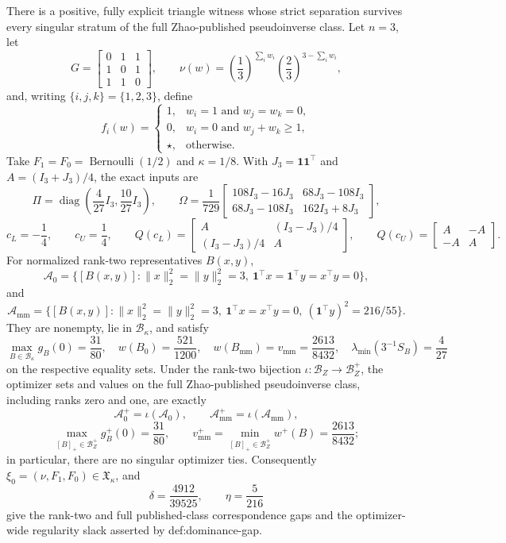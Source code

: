 There is a positive, fully explicit triangle witness whose strict separation survives every singular stratum of the full Zhao-published pseudoinverse class.  Let \(n=3\), let
\[
G=\begin{bmatrix}0&1&1\\1&0&1\\1&1&0\end{bmatrix},
\qquad
\nu(w)=\left(\frac13\right)^{\sum_iw_i}
       \left(\frac23\right)^{3-\sum_iw_i},
\]
and, writing \(\{i,j,k\}=\{1,2,3\}\), define
\[
f_i(w)=
\begin{cases}
1,&w_i=1\text{ and }w_j=w_k=0,\\
0,&w_i=0\text{ and }w_j+w_k\ge1,\\
\star,&\text{otherwise}.
\end{cases}
\]
Take \(F_1=F_0=\operatorname{Bernoulli}(1/2)\) and \(\kappa=1/8\).  With \(J_3=\mathbf1\mathbf1^{\top}\) and \(A=(I_3+J_3)/4\), the exact inputs are
\[
\Pi=\operatorname{diag}\!\left(\frac4{27}I_3,\frac{10}{27}I_3\right),
\qquad
\Omega=\frac1{729}
\begin{bmatrix}
108I_3-16J_3&68J_3-108I_3\\
68J_3-108I_3&162I_3+8J_3
\end{bmatrix},
\]
\[
c_L=-\frac14,
\qquad c_U=\frac14,
\qquad
Q(c_L)=\begin{bmatrix}A&(I_3-J_3)/4\\(I_3-J_3)/4&A\end{bmatrix},
\qquad
Q(c_U)=\begin{bmatrix}A&-A\\-A&A\end{bmatrix}.
\]
For normalized rank-two representatives \(B(x,y)\),
\[
\mathcal A_0=\{[B(x,y)]:\lVert x\rVert_2^2=\lVert y\rVert_2^2=3,
\ \mathbf1^{\top}x=\mathbf1^{\top}y=x^{\top}y=0\},
\]
and
\[
\mathcal A_{\mathrm{mm}}=\{[B(x,y)]:\lVert x\rVert_2^2=\lVert y\rVert_2^2=3,
\ \mathbf1^{\top}x=x^{\top}y=0,
\ (\mathbf1^{\top}y)^2=216/55\}.
\]
They are nonempty, lie in \(\mathcal B_\kappa\), and satisfy
\[
\max_{B\in\mathcal B_\kappa}g_B(0)=\frac{31}{80},
\quad w(B_0)=\frac{521}{1200},
\quad w(B_{\mathrm{mm}})=v_{\mathrm{mm}}=\frac{2613}{8432},
\quad \lambda_{\min}(3^{-1}S_B)=\frac4{27}
\]
on the respective equality sets.  Under the rank-two bijection \(\iota:\mathcal B_Z\to\mathcal B_Z^+\), the optimizer sets and values on the full Zhao-published pseudoinverse class, including ranks zero and one, are exactly
\[
\mathcal A_0^+=\iota(\mathcal A_0),
\qquad \mathcal A_{\mathrm{mm}}^+=\iota(\mathcal A_{\mathrm{mm}}),
\]
\[
\max_{[B]_+\in\mathcal B_Z^+}g_B^+(0)=\frac{31}{80},
\qquad v_{\mathrm{mm}}^+=\min_{[B]_+\in\mathcal B_Z^+}w^+(B)=\frac{2613}{8432};
\]
in particular, there are no singular optimizer ties.  Consequently \(\xi_0=(\nu,F_1,F_0)\in\mathfrak X_\kappa\), and
\[
\delta=\frac{4912}{39525},\qquad \eta=\frac5{216}
\]
give the rank-two and full published-class correspondence gaps and the optimizer-wide regularity slack asserted by def:dominance-gap.